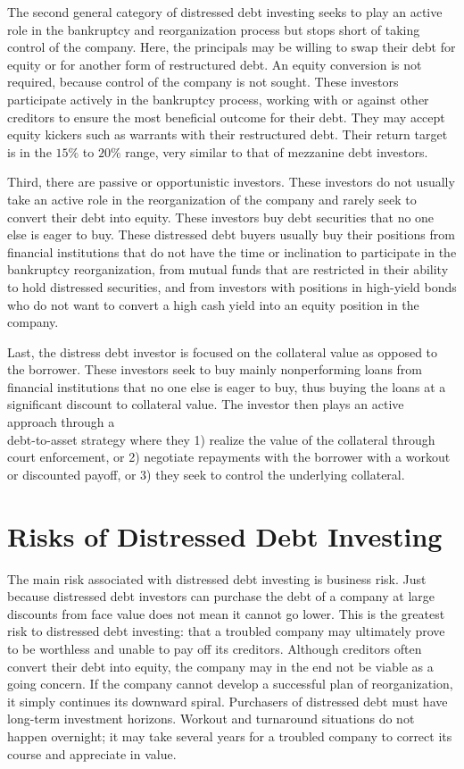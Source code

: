\documentclass[11pt]{article}
\begin{document}
The second general category of distressed debt investing seeks to play an active role in the bankruptcy and reorganization process but stops short of taking control of the company. Here, the principals may be willing to swap their debt for equity or for another form of restructured debt. An equity conversion is not required, because control of the company is not sought. These investors participate actively in the bankruptcy process, working with or against other creditors to ensure the most beneficial outcome for their debt. They may accept equity kickers such as warrants with their restructured debt. Their return target is in the $15 \%$ to $20 \%$ range, very similar to that of mezzanine debt investors.

Third, there are passive or opportunistic investors. These investors do not usually take an active role in the reorganization of the company and rarely seek to convert their debt into equity. These investors buy debt securities that no one else is eager to buy. These distressed debt buyers usually buy their positions from financial institutions that do not have the time or inclination to participate in the bankruptcy reorganization, from mutual funds that are restricted in their ability to hold distressed securities, and from investors with positions in high-yield bonds who do not want to convert a high cash yield into an equity position in the company.

Last, the distress debt investor is focused on the collateral value as opposed to the borrower. These investors seek to buy mainly nonperforming loans from financial institutions that no one else is eager to buy, thus buying the loans at a significant discount to collateral value. The investor then plays an active approach through a\\
debt-to-asset strategy where they 1) realize the value of the collateral through court enforcement, or 2) negotiate repayments with the borrower with a workout or discounted payoff, or 3) they seek to control the underlying collateral.

\section*{Risks of Distressed Debt Investing}
The main risk associated with distressed debt investing is business risk. Just because distressed debt investors can purchase the debt of a company at large discounts from face value does not mean it cannot go lower. This is the greatest risk to distressed debt investing: that a troubled company may ultimately prove to be worthless and unable to pay off its creditors. Although creditors often convert their debt into equity, the company may in the end not be viable as a going concern. If the company cannot develop a successful plan of reorganization, it simply continues its downward spiral. Purchasers of distressed debt must have long-term investment horizons. Workout and turnaround situations do not happen overnight; it may take several years for a troubled company to correct its course and appreciate in value.
\end{document}
